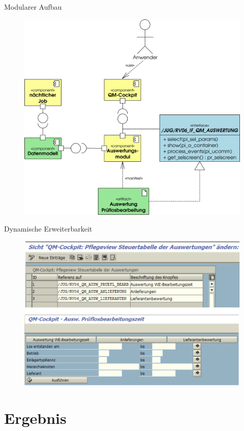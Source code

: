 \begin{frame}{Modularer Aufbau}
\begin{figure}[tb]
\includegraphics[width=.92\textwidth]{Komponenten}
\end{figure}
\end{frame}

\begin{frame}{Dynamische Erweiterbarkeit}
\begin{figure}[tb]
\includegraphics[width=\textwidth]{images/ErweiterbarkeitA}
\end{figure}
\end{frame}

\section{Ergebnis}
